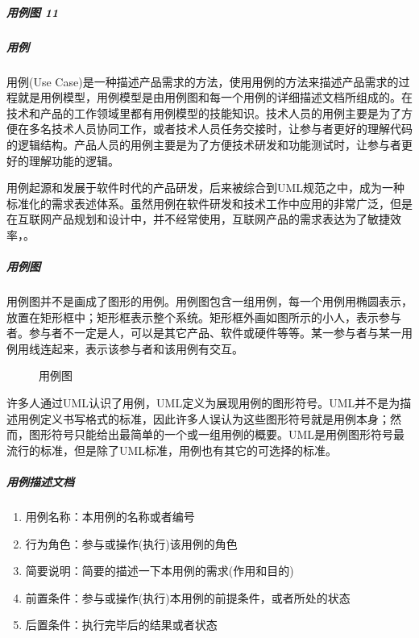 \documentclass[letterpaper,11pt,english]{sphinxmanual}
\begin{document}
\subparagraph{用例图 11\sphinxfootnotemark[515]}
\label{\detokenize{chapter_knowledge/flow_chart:id23}}%
\begin{footnotetext}[515]\sphinxAtStartFootnote
{}
%
\end{footnotetext}\ignorespaces 

\subparagraph{用例}
\label{\detokenize{chapter_knowledge/flow_chart:id24}}
用例(Use
Case)是一种描述产品需求的方法，使用用例的方法来描述产品需求的过程就是用例模型，用例模型是由用例图和每一个用例的详细描述文档所组成的。在技术和产品的工作领域里都有用例模型的技能知识。技术人员的用例主要是为了方便在多名技术人员协同工作，或者技术人员任务交接时，让参与者更好的理解代码的逻辑结构。产品人员的用例主要是为了方便技术研发和功能测试时，让参与者更好的理解功能的逻辑。

用例起源和发展于软件时代的产品研发，后来被综合到UML规范之中，成为一种标准化的需求表述体系。虽然用例在软件研发和技术工作中应用的非常广泛，但是在互联网产品规划和设计中，并不经常使用，互联网产品的需求表达为了敏捷效率，。


\subparagraph{用例图}
\label{\detokenize{chapter_knowledge/flow_chart:id25}}
用例图并不是画成了图形的用例。用例图包含一组用例，每一个用例用椭圆表示，放置在矩形框中；矩形框表示整个系统。矩形框外画如图所示的小人，表示参与者。参与者不一定是人，可以是其它产品、软件或硬件等等。某一参与者与某一用例用线连起来，表示该参与者和该用例有交互。

\begin{figure}[H]
\centering
\capstart

\noindent{}
\caption{用例图}\label{\detokenize{chapter_knowledge/flow_chart:id42}}\end{figure}

许多人通过UML认识了用例，UML定义为展现用例的图形符号。UML并不是为描述用例定义书写格式的标准，因此许多人误认为这些图形符号就是用例本身；然而，图形符号只能给出最简单的一个或一组用例的概要。UML是用例图形符号最流行的标准，但是除了UML标准，用例也有其它的可选择的标准。


\subparagraph{用例描述文档}
\label{\detokenize{chapter_knowledge/flow_chart:id26}}\begin{enumerate}
%
\item {} 
用例名称：本用例的名称或者编号

\item {} 
行为角色：参与或操作(执行)该用例的角色

\item {} 
简要说明：简要的描述一下本用例的需求(作用和目的)

\item {} 
前置条件：参与或操作(执行)本用例的前提条件，或者所处的状态

\item {} 
后置条件：执行完毕后的结果或者状态

\end{enumerate}
\end{document}
